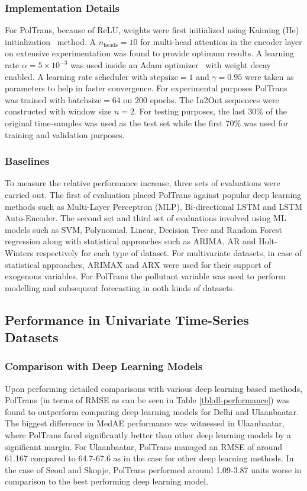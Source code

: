 \documentclass[10pt,journal]{IEEEtran}
\begin{document}
\subsubsection{Implementation Details}
For {PolTrans}, because of ReLU, weights were first initialized using Kaiming (He) initialization~\cite{He.2015} method. A ${n_{\text{heads}} = 10}$ for multi-head attention in the encoder layer on extensive experimentation was found to provide optimum results. A learning rate ${\alpha = 5 \times 10^{-3}}$ was used inside an Adam optimizer~\cite{Kingma.2014} with weight decay enabled. A learning rate scheduler with ${\mathrm{stepsize} = 1}$ and ${\gamma = 0.95}$ were taken as parameters to help in faster convergence. For experimental purposes {PolTrans} was trained with ${\mathrm{batchsize} = 64}$ on 200 epochs. The In2Out sequences were constructed with window size ${n = 2}$. For testing purposes, the last 30\% of the original time-samples was used as the test set while the first 70\% was used for training and validation purposes.

\subsubsection{Baselines}
To measure the relative performance increase, three sets of evaluations were carried out. The first of evaluation placed {PolTrans} against popular deep learning methods such as Multi-Layer Perceptron (MLP), Bi-directional LSTM and LSTM Auto-Encoder. The second set and third set of evaluations involved using ML models such as SVM, Polynomial, Linear, Decision Tree and Random Forest regression along with statistical approaches such as ARIMA, AR and Holt-Winters respectively for each type of dataset.
For multivariate datasets, in case of statistical approaches, ARIMAX and ARX were used for their support of exogenous variables. For {PolTrans} the pollutant variable was used to perform modelling and subsequent forecasting in ooth kinds of datasets.

\subsection{Performance in Univariate Time-Series Datasets}

\subsubsection{Comparison with Deep Learning Models}

Upon performing detailed comparisons with various deep learning based methods, {PolTrans} (in terms of RMSE as can be seen in Table \ref{tbl:dl-performance}) was found to outperform comparing deep learning models for Delhi and Ulaanbaatar. The biggest difference in MedAE performance was witnessed in Ulaanbaatar, where {PolTrans} fared significantly better than other deep learning models by a significant margin. For Ulaanbaatar, {PolTrans} managed an RMSE of around 61.167 compared to 64.7-67.6 as in the case for other deep learning methods. In the case of Seoul and Skopje, {PolTrans} performed around 1.09-3.87 units worse in comparison to the best performing deep learning model.
\end{document}
